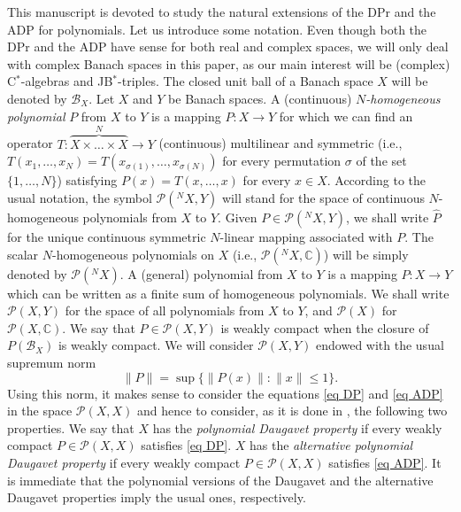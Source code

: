 \documentclass[10pt]{amsart}
\def\CC{{\mathbb{C}}}
\begin{document}
	This manuscript is devoted to study the natural extensions of the DPr and the ADP for polynomials. Let us introduce some notation. Even though both the DPr and the ADP have sense for both real and complex spaces, we will only deal with complex Banach spaces in this paper, as our main interest will be (complex) C$^*$-algebras and JB$^*$-triples. The closed unit ball of a Banach space $X$ will be denoted by $\mathcal{B}_{X}$. Let $X$ and $Y$ be Banach spaces. A (continuous) \emph{$N$-homogeneous polynomial} $P$ from $X$ to $Y$ is a mapping $P\colon X \longrightarrow Y$ for which we can find an operator $T\colon \overbrace{X\times \ldots \times X}^{N} \longrightarrow Y$ (continuous) multilinear and symmetric (i.e., $T(x_1,\ldots, x_N) = T(x_{\sigma(1)},\ldots, x_{\sigma(N)})$ for every permutation $\sigma$ of the set $\{1,\ldots, N\}$) satisfying $P(x) = T(x , \ldots , x)$ for every  $x \in X$. According to the usual notation, the symbol $\mathcal{P}(^N X,Y)$ will stand for the space of continuous $N$-homogeneous polynomials from $X$ to $Y$. Given $P\in \mathcal{P}(^N X,Y)$, we shall write $\widehat{P}$ for the unique continuous symmetric $N$-linear mapping associated with $P$. The scalar $N$-homogeneous polynomials on $X$ (i.e., $\mathcal{P}(^N X,\mathbb{C})$) will be simply denoted by $\mathcal{P}(^N X)$. A (general) polynomial from $X$ to $Y$ is a mapping $P\colon X\longrightarrow Y$ which can be written as a finite sum of homogeneous polynomials. We shall write $\mathcal{P}(X,Y)$ for the space of all polynomials from $X$ to $Y$, and $\mathcal{P}(X)$ for $\mathcal{P}(X,\CC)$. We say that $P\in \mathcal{P}(X,Y)$ is weakly compact when the closure of $P(\mathcal{B}_X)$ is weakly compact. We will consider $\mathcal{P}(X,Y)$ endowed with the usual supremum norm
	$$
	\| P \| = \sup\{ \| P(x)\| \colon \|x\| \leq 1\}.
	$$
	Using this norm, it makes sense to consider the equations \eqref{eq DP} and \eqref{eq ADP} in the space $\mathcal{P}(X,X)$ and hence to consider, as it is done in \cite{ChoGarMaestreMartin2007,cgmm2,Santos-studia}, the following two properties. We say that $X$ has the \emph{polynomial Daugavet property} \cite{ChoGarMaestreMartin2007,cgmm2} if every weakly compact $P\in \mathcal{P}(X,X)$ satisfies \eqref{eq DP}. $X$ has the \emph{alternative polynomial Daugavet property} if every weakly compact $P\in \mathcal{P}(X,X)$ satisfies \eqref{eq ADP}. It is immediate that the polynomial versions of the Daugavet and the alternative Daugavet properties imply the usual ones, respectively.
	
\end{document}
